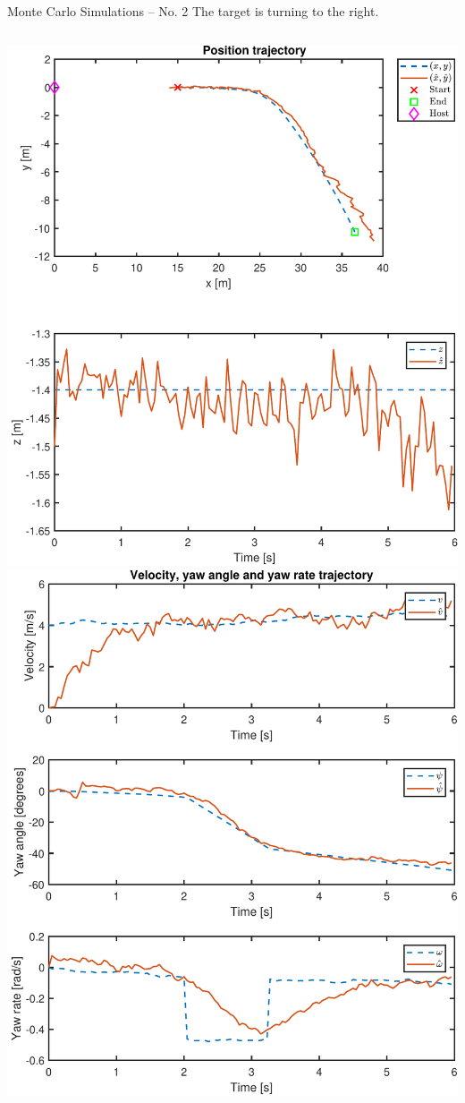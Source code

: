 \documentclass{beamer}
\begin{document}
\begin{frame}{Monte Carlo Simulations -- No. 2}
	The target is turning to the right.
	\vspace{1em}
	\begin{columns}
	\includegraphics[width=\textwidth]{Traj/23_MC_TrajPos}
	\includegraphics[width=\textwidth]{Traj/23_MC_TrajOther}
	\end{columns}


\end{frame}
\end{document}
